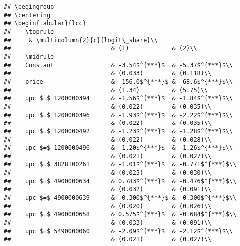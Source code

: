 \documentclass[
]{article}
\begin{document}
\begin{verbatim}
## \begingroup
## \centering
## \begin{tabular}{lcc}
##    \toprule
##     & \multicolumn{2}{c}{logit\_share}\\
##                            & (1)            & (2)\\  
##    \midrule 
##    Constant                & -3.54$^{***}$  & -5.37$^{***}$\\   
##                            & (0.033)        & (0.118)\\   
##    price                   & -156.0$^{***}$ & -68.6$^{***}$\\   
##                            & (1.34)         & (5.75)\\   
##    upc $=$ 1200000394      & -1.56$^{***}$  & -1.84$^{***}$\\   
##                            & (0.022)        & (0.035)\\   
##    upc $=$ 1200000396      & -1.93$^{***}$  & -2.22$^{***}$\\   
##                            & (0.022)        & (0.035)\\   
##    upc $=$ 1200000492      & -1.23$^{***}$  & -1.28$^{***}$\\   
##                            & (0.022)        & (0.028)\\   
##    upc $=$ 1200000496      & -1.20$^{***}$  & -1.26$^{***}$\\   
##                            & (0.021)        & (0.027)\\   
##    upc $=$ 3828100261      & -1.01$^{***}$  & -0.771$^{***}$\\   
##                            & (0.025)        & (0.030)\\   
##    upc $=$ 4900000634      & 0.783$^{***}$  & -0.476$^{***}$\\   
##                            & (0.032)        & (0.091)\\   
##    upc $=$ 4900000639      & -0.300$^{***}$ & -0.300$^{***}$\\   
##                            & (0.020)        & (0.026)\\   
##    upc $=$ 4900000658      & 0.575$^{***}$  & -0.684$^{***}$\\   
##                            & (0.033)        & (0.091)\\   
##    upc $=$ 5490000060      & -2.09$^{***}$  & -2.12$^{***}$\\   
##                            & (0.021)        & (0.027)\\   

\end{verbatim}
\end{document}
